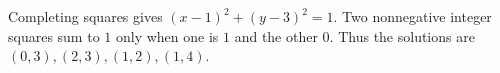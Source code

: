 Completing squares gives $(x-1)^2+(y-3)^2=1$. Two nonnegative integer squares sum to $1$ only when one is $1$ and the other $0$. Thus the solutions are $\boxed{(0,3),(2,3),(1,2),(1,4)}$.
